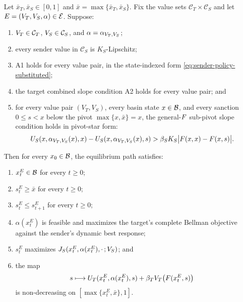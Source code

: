 \begin{theorem}
\label{thm:persistence}
Let $\bar x_T,\bar x_S\in[0,1]$ and
$\bar x=\max\{\bar x_T,\bar x_S\}$. Fix the value sets
$\mathcal C_T\times\mathcal C_S$ and let
$E=(V_T,V_S,\alpha)\in\mathcal E$. Suppose:
\begin{enumerate}[label=(P\arabic*),leftmargin=2.7em]
\item $V_T\in\mathcal C_T$, $V_S\in\mathcal C_S$, and
$\alpha=\alpha_{V_T,V_S}$;
\item every sender value in $\mathcal C_S$ is $K_S$-Lipschitz;
\item A1 holds for every value pair, in the state-indexed form
\eqref{eq:sender-policy-substituted};
\item the target combined slope condition A2 holds for every value pair; and
\item for every value pair $(V_T,V_S)$, every basin state $x\in\mathcal{B}$,
and every sanction $0\le s<x$ below the pivot $\max\{x,\bar x\}=x$, the
general-$F$ sub-pivot slope condition holds in pivot-star form:
\[
U_S\!\left(x,\alpha_{V_T,V_S}(x),x\right)
-
U_S\!\left(x,\alpha_{V_T,V_S}(x),s\right)
>
\beta_S K_S\bigl|F(x,x)-F(x,s)\bigr|.
\]
\end{enumerate}
Then for every $x_0\in\mathcal{B}$, the equilibrium path satisfies:
\begin{enumerate}[label=(\roman*)]
\item $x^E_t\in\mathcal{B}$ for every $t\ge0$;
\item $s^E_t\ge\bar x$ for every $t\ge0$;
\item $s^E_t\le s^E_{t+1}$ for every $t\ge0$;
\item $\alpha(x_t^E)$ is feasible and maximizes the target's complete
Bellman objective against the sender's dynamic best response;
\item $s_t^E$ maximizes $J_S(x_t^E,\alpha(x_t^E),\cdot\,;V_S)$; and
\item the map
\[
s\longmapsto
U_T(x_t^E,\alpha(x_t^E),s)
+\beta_TV_T\bigl(F(x_t^E,s)\bigr)
\]
is non-decreasing on $[\max\{x_t^E,\bar x\},1]$.
\end{enumerate}
\end{theorem}

